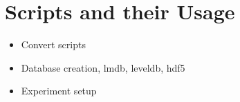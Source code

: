 \section{Scripts and their Usage}
\label{sec:scripts}

\begin{itemize}
	\item Convert scripts
	\item Database creation, lmdb, leveldb, hdf5
	\item Experiment setup
\end{itemize}

